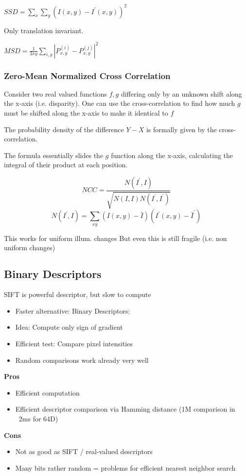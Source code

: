\begin{enumerate}
$SSD = \sum_x \sum_y (I(x,y) - I^\prime(x,y))^2$

Only translation invariant.

$MSD=\frac{1}{2xy} \sum_{i,y}\left|P_{x,y}^{(i)} - P^{(j)}_{x,y}\right|^2$


\subsubsection{Zero-Mean Normalized Cross Correlation}
Consider two real valued functions  $f,g$  differing only by an unknown shift along the x-axis (i.e. disparity). One can use the cross-correlation to find how much $g$ must be shifted along the x-axis to make it identical to $f$ 

The probability density of the difference $Y-X$ is formally given by the cross-correlation.

The formula essentially slides the $g$ function along the x-axis, calculating the integral of their product at each position.

$$ NCC = \frac{N(I^\prime,I)}{\sqrt{N(I,I)N(I^\prime,I^\prime)}} $$
$$ N(I^\prime,I) = \sum_{xy} (I(x,y) - \bar I )(I^\prime(x,y) - \bar I^\prime ) $$

This works for uniform illum. changes
But even this is still fragile (i.e. non uniform changes)

\subsection{Binary Descriptors}

SIFT is powerful descriptor, but slow to compute
\begin{itemize}
\item Faster alternative: Binary Descriptors:
\item Idea: Compute only sign of gradient
\item Efficient test: Compare pixel intensities
\item Random comparisons work already very well
\end{itemize}

\textbf{Pros}
\begin{itemize}
\item Efficient computation
\item Efficient descriptor comparison via Hamming distance (1M comparison in ~2ms for 64D)
\end{itemize}

\textbf{Cons}
\begin{itemize}
\item Not as good as SIFT / real-valued descriptors
\item Many bits rather random = problems for efficient nearest neighbor search
\end{itemize}



\end{enumerate}
